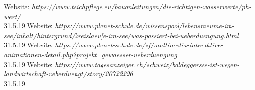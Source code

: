 \documentclass{article}
\begin{document}
\begin{thebibliography}{9}
{        
        Website: \textit{https://www.teichpflege.eu/bauanleitungen/die-richtigen-wasserwerte/ph-wert/} \\ 31.5.19
        Website: \textit{https://www.planet-schule.de/wissenspool/lebensraeume-im-see/inhalt/hintergrund/kreislaeufe-im-see/was-passiert-bei-ueberduengung.html} \\ 31.5.19
        Website: \textit{https://www.planet-schule.de/sf/multimedia-interaktive-animationen-detail.php?projekt=gewaesser-ueberduengung} \\ 31.5.19
        Website: \textit{https://www.tagesanzeiger.ch/schweiz/baldeggersee-ist-wegen-landwirtschaft-ueberduengt/story/20722296} \\ 31.5.19
        
        
        
    }
    \end{thebibliography}
\end{document}
